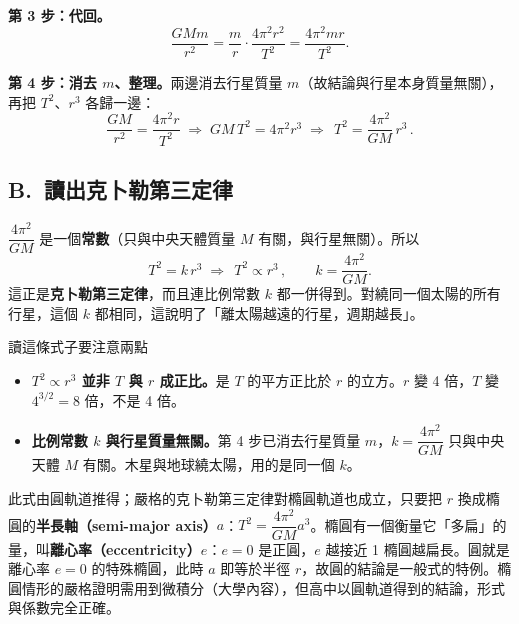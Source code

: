 \documentclass[11pt]{article}
\begin{document}
\textbf{第 3 步：代回。}
$$\dfrac{GMm}{r^{2}}=\dfrac{m}{r}\cdot\dfrac{4\pi^2 r^2}{T^2}=\dfrac{4\pi^2 m r}{T^2}.$$

\textbf{第 4 步：消去 $m$、整理。}兩邊消去行星質量 $m$（故結論與行星本身質量無關），再把 $T^2$、$r^3$ 各歸一邊：
$$\dfrac{GM}{r^{2}}=\dfrac{4\pi^2 r}{T^2}\;\Longrightarrow\;GM\,T^2=4\pi^2 r^3\;\Longrightarrow\;\boxed{\,T^{2}=\dfrac{4\pi^2}{GM}\,r^{3}\,}.$$


\subsection*{\sffamily B.\ 讀出克卜勒第三定律}

$\dfrac{4\pi^2}{GM}$ 是一個\textbf{常數}（只與中央天體質量 $M$ 有關，與行星無關）。所以
$$T^2=k\,r^3\;\Longrightarrow\;\boxed{\,T^2\propto r^3\,},\qquad k=\dfrac{4\pi^2}{GM}.$$
這正是\textbf{克卜勒第三定律}，而且連比例常數 $k$ 都一併得到。對繞同一個太陽的所有行星，這個 $k$ 都相同，這說明了「離太陽越遠的行星，週期越長」。

\begin{補充框}{讀這條式子要注意兩點}
\begin{itemize}\setlength{\itemsep}{1pt}
\item \textbf{$T^2\propto r^3$ 並非 $T$ 與 $r$ 成正比。}是 $T$ 的平方正比於 $r$ 的立方。$r$ 變 4 倍，$T$ 變 $4^{3/2}=8$ 倍，不是 4 倍。
\item \textbf{比例常數 $k$ 與行星質量無關。}第 4 步已消去行星質量 $m$，$k=\dfrac{4\pi^2}{GM}$ 只與中央天體 $M$ 有關。木星與地球繞太陽，用的是同一個 $k$。
\end{itemize}
此式由圓軌道推得；嚴格的克卜勒第三定律對橢圓軌道也成立，只要把 $r$ 換成橢圓的\textbf{半長軸（semi-major axis）}$a$：$T^2=\dfrac{4\pi^2}{GM}a^3$。橢圓有一個衡量它「多扁」的量，叫\textbf{離心率（eccentricity）}$e$：$e=0$ 是正圓，$e$ 越接近 1 橢圓越扁長。圓就是離心率 $e=0$ 的特殊橢圓，此時 $a$ 即等於半徑 $r$，故圓的結論是一般式的特例。橢圓情形的嚴格證明需用到微積分（大學內容），但高中以圓軌道得到的結論，形式與係數完全正確。
\end{補充框}
\end{document}
